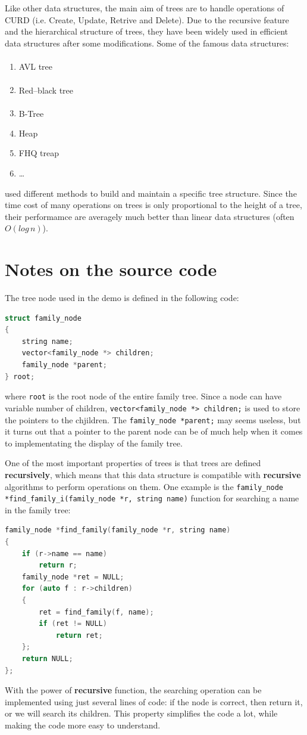 \documentclass[cn,black,12pt,normal]{elegantnote}
\newcommand{\uct}[1]{\textsuperscript{\textsuperscript{\cite{#1}}}}
\begin{document}
Like other data structures, the main aim of trees are to handle operations of CURD (i.e. Create, Update, Retrive and Delete). Due to the recursive feature and the hierarchical structure of trees, they have been widely used in efficient data structures after some modifications. Some of the famous data structures:
\begin{enumerate}
    \item AVL tree\uct{sedgewick1983balanced}
    \item Red–black tree\uct{bayer1972symmetric}
    \item B-Tree\uct{luo2011organization}
    \item Heap
    \item FHQ treap
    \item \dots
\end{enumerate}
used different methods to build and maintain a specific tree structure. Since the time cost of many operations on trees is only proportional to the height of a tree, their performamce are averagely much better than linear data structures (often $O(log\,n)$).

\section{Notes on the source code}

The tree node used in the demo is defined in the following code:
\begin{lstlisting}[language = C++]
struct family_node
{
	string name;
	vector<family_node *> children;
	family_node *parent;
} root;
\end{lstlisting}
where \lstinline{root} is the root node of the entire family tree. Since a node can have variable number of children, \lstinline{vector<family_node *> children;} is used to store the pointers to the chjildren. The \lstinline{family_node *parent;} may seems useless, but it turns out that a pointer to the parent node can be of much help when it comes to implementating the display of the family tree. 

One of the most important properties of trees is that trees are defined \textbf{recursively}, which means that this data structure is compatible with \textbf{recursive} algorithms to perform operations on them. One example is the \lstinline{family_node *find_family_i(family_node *r, string name)} function for searching a name in the family tree: 
\begin{lstlisting}[language = C++]
family_node *find_family(family_node *r, string name)
{
	if (r->name == name)
		return r;
	family_node *ret = NULL;
	for (auto f : r->children)
	{
		ret = find_family(f, name);
		if (ret != NULL)
			return ret;
	};
	return NULL;
};
\end{lstlisting}
With the power of \textbf{recursive} function, the searching operation can be implemented using just several lines of code: if the node is correct, then return it, or we will search its children. This property simplifies the code a lot, while making the code more easy to understand.
\end{document}
